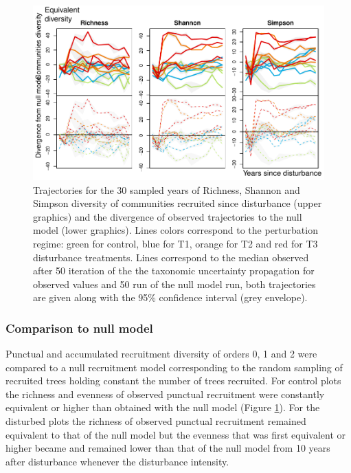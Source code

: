 \documentclass[fleqn,10pt]{ArtEcoFoG} %
\begin{document}
\begin{figure}

{\centering \includegraphics[width=0.8\linewidth]{RecruitmentTrajectories_files/figure-latex/Fig2-1} 

}

\caption{Trajectories for the 30 sampled years of Richness, Shannon and Simpson diversity of communities recruited since disturbance (upper graphics) and the divergence of observed trajectories to the null model (lower graphics). Lines colors correspond to the perturbation regime: green for control, blue for T1, orange for T2 and red for T3 disturbance treatments. Lines correspond to the median observed after 50 iteration of the the taxonomic uncertainty propagation for observed values and 50 run of the null model run, both trajectories are given along with the 95\% confidence interval (grey envelope).}\label{fig:Fig2}
\end{figure}

\subsubsection{Comparison to null model}\label{comparison-to-null-model}

Punctual and accumulated recruitment diversity of orders 0, 1 and 2 were
compared to a null recruitment model corresponding to the random
sampling of recruited trees holding constant the number of trees
recruited. For control plots the richness and evenness of observed
punctual recruitment were constantly equivalent or higher than obtained
with the null model (Figure \ref{fig:Fig2}). For the disturbed plots the
richness of observed punctual recruitment remained equivalent to that of
the null model but the evenness that was first equivalent or higher
became and remained lower than that of the null model from 10 years
after disturbance whenever the disturbance intensity.
\end{document}
